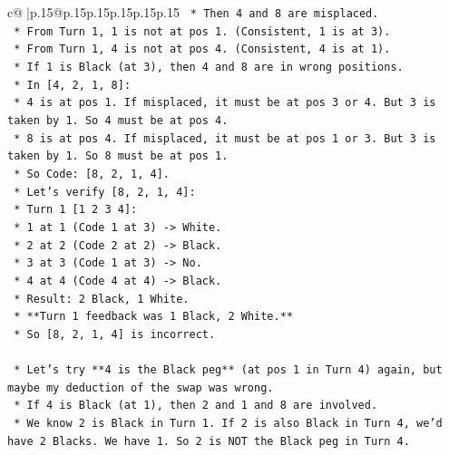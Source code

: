 \documentclass{article}
\begin{document}
{\begin{supertabular}{c@{$\;$}|p{.15\linewidth}@{}p{.15\linewidth}p{.15\linewidth}p{.15\linewidth}p{.15\linewidth}p{.15\linewidth}}
{{{\texttt{                    *   Then 4 and 8 are misplaced.} \\
\texttt{                    *   From Turn 1, 1 is not at pos 1. (Consistent, 1 is at 3).} \\
\texttt{                    *   From Turn 1, 4 is not at pos 4. (Consistent, 4 is at 1).} \\
\texttt{                    *   If 1 is Black (at 3), then 4 and 8 are in wrong positions.} \\
\texttt{                    *   In {[}4, 2, 1, 8{]}:} \\
\texttt{                        *   4 is at pos 1. If misplaced, it must be at pos 3 or 4. But 3 is taken by 1. So 4 must be at pos 4.} \\
\texttt{                        *   8 is at pos 4. If misplaced, it must be at pos 1 or 3. But 3 is taken by 1. So 8 must be at pos 1.} \\
\texttt{                        *   So Code: {[}8, 2, 1, 4{]}.} \\
\texttt{                    *   Let's verify {[}8, 2, 1, 4{]}:} \\
\texttt{                        *   Turn 1 {[}1 2 3 4{]}:} \\
\texttt{                            *   1 at 1 (Code 1 at 3) {-}> White.} \\
\texttt{                            *   2 at 2 (Code 2 at 2) {-}> Black.} \\
\texttt{                            *   3 at 3 (Code 1 at 3) {-}> No.} \\
\texttt{                            *   4 at 4 (Code 4 at 4) {-}> Black.} \\
\texttt{                            *   Result: 2 Black, 1 White.} \\
\texttt{                            *   **Turn 1 feedback was 1 Black, 2 White.**} \\
\texttt{                            *   So {[}8, 2, 1, 4{]} is incorrect.} \\
\\ 
\texttt{                *   Let's try **4 is the Black peg** (at pos 1 in Turn 4) again, but maybe my deduction of the swap was wrong.} \\
\texttt{                    *   If 4 is Black (at 1), then 2 and 1 and 8 are involved.} \\
\texttt{                    *   We know 2 is Black in Turn 1. If 2 is also Black in Turn 4, we'd have 2 Blacks. We have 1. So 2 is NOT the Black peg in Turn 4.} \\
}}}
\end{supertabular}}
\end{document}

